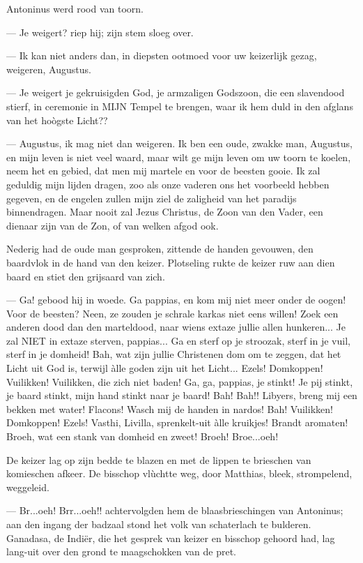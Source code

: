 \documentclass[a4paper, 12pt, oneside, dutch]{article}
\begin{document}
Antoninus werd rood van toorn.

--- Je weigert? riep hij; zijn stem sloeg over.

--- Ik kan niet anders dan, in diepsten ootmoed voor uw keizerlijk gezag, weigeren, Augustus.

--- Je weigert je gekruisigden God, je armzaligen Godszoon, die een slavendood stierf, in ceremonie in MIJN Tempel te brengen, waar ik hem duld in den afglans van het hoògste Licht??

--- Augustus, ik mag niet dan weigeren. Ik ben een oude, zwakke man, Augustus, en mijn leven is niet veel waard, maar wilt ge mijn leven om uw toorn te koelen, neem het en gebied, dat men mij martele en voor de beesten gooie. Ik zal geduldig mijn lijden dragen, zoo als onze vaderen ons het voorbeeld hebben gegeven, en de engelen zullen mijn ziel de zaligheid van het paradijs binnendragen. Maar nooit zal Jezus Christus, de Zoon van den Vader, een dienaar zijn van de Zon, of van welken afgod ook.

Nederig had de oude man gesproken, zittende de handen gevouwen, den baardvlok in de hand van den keizer. Plotseling rukte de keizer ruw aan dien baard en stiet den grijsaard van zich.

--- Ga! gebood hij in woede. Ga pappias, en kom mij niet meer onder de oogen! Voor de beesten? Neen, ze zouden je schrale karkas niet eens willen! Zoek een anderen dood dan den marteldood, naar wiens extaze jullie allen hunkeren... Je zal NIET in extaze sterven, pappias... Ga en sterf op je stroozak, sterf in je vuil, sterf in je domheid! Bah, wat zijn jullie Christenen dom om te zeggen, dat het Licht uit God is, terwijl àlle goden zijn uit het Licht... Ezels! Domkoppen! Vuilikken! Vuilikken, die zich niet baden! Ga, ga, pappias, je stinkt! Je pij stinkt, je baard stinkt, mijn hand stinkt naar je baard! Bah! Bah!! Libyers, breng mij een bekken met water! Flacons! Wasch mij de handen in nardos! Bah! Vuilikken! Domkoppen! Ezels! Vasthi, Livilla, sprenkelt-uit àlle kruikjes! Brandt aromaten! Broeh, wat een stank van domheid en zweet! Broeh! Broe...oeh!

De keizer lag op zijn bedde te blazen en met de lippen te brieschen van komieschen afkeer. De bisschop vlùchtte weg, door Matthias, bleek, strompelend, weggeleid.

--- Br...oeh! Brr...oeh!! achtervolgden hem de blaasbrieschingen van Antoninus; aan den ingang der badzaal stond het volk van schaterlach te bulderen. Ganadasa, de Indiër, die het gesprek van keizer en bisschop gehoord had, lag lang-uit over den grond te maagschokken van de pret.
\end{document}
